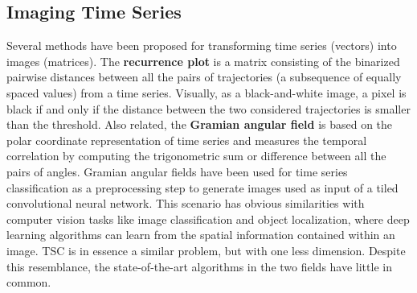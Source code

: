 



\subsection{Imaging Time Series}



Several methods have been proposed for transforming time series (vectors) into images (matrices). 
The \textbf{recurrence plot} \cite{eckmann1995recurrence} is a matrix consisting of the binarized pairwise distances between all the pairs of trajectories (a subsequence of equally spaced values) from a time series. Visually, as a black-and-white image, a pixel is black if and only if the distance between the two considered trajectories is smaller than the threshold.
Also related, the \textbf{Gramian angular field} \cite{wang2015encoding} is based on the polar coordinate representation of time series and measures the temporal correlation by computing the trigonometric sum or difference between all the pairs of angles. Gramian angular fields have been used for time series classification as a preprocessing step to generate images used as input of a tiled convolutional neural network.
This scenario has obvious similarities with computer vision tasks like image classification and object localization, where deep learning algorithms can learn from the spatial information contained within an image. TSC is in essence a similar problem, but with one less dimension. Despite this resemblance, the state-of-the-art algorithms in the two fields have little in common.
    
